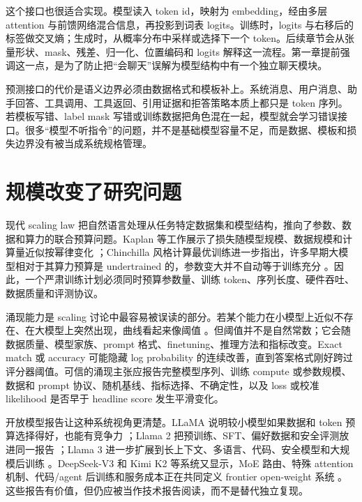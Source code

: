 \documentclass[UTF8,zihao=-4,openany]{ctexbook}
\begin{document}
这个接口也很适合实现。模型读入 token id，映射为 embedding，经由多层 attention 与前馈网络混合信息，再投影到词表 logits。训练时，logits 与右移后的标签做交叉熵；生成时，从概率分布中采样或选择下一个 token。后续章节会从张量形状、mask、残差、归一化、位置编码和 logits 解释这一流程。第一章提前强调这一点，是为了防止把“会聊天”误解为模型结构中有一个独立聊天模块。

预测接口的代价是语义边界必须由数据格式和模板补上。系统消息、用户消息、助手回答、工具调用、工具返回、引用证据和拒答策略本质上都只是 token 序列。若模板写错、label mask 写错或训练数据把角色混在一起，模型就会学习错误接口。很多“模型不听指令”的问题，并不是基础模型容量不足，而是数据、模板和损失边界没有被当成系统规格管理。

\section{规模改变了研究问题}
现代 scaling law 把自然语言处理从任务特定数据集和模型结构，推向了参数、数据和算力的联合预算问题。Kaplan 等工作展示了损失随模型规模、数据规模和计算量近似按幂律变化 \cite{kaplan2020scaling}；Chinchilla 风格计算最优训练进一步指出，许多早期大模型相对于其算力预算是 undertrained 的，参数变大并不自动等于训练充分 \cite{hoffmann2022training}。因此，一个严肃训练计划必须同时预算参数量、训练 token、序列长度、硬件吞吐、数据质量和评测协议。

涌现能力是 scaling 讨论中最容易被误读的部分。若某个能力在小模型上近似不存在、在大模型上突然出现，曲线看起来像阈值 \cite{wei2022emergent}。但阈值并不是自然常数；它会随数据质量、模型家族、prompt 格式、finetuning、推理方法和指标改变。Exact match 或 accuracy 可能隐藏 log probability 的连续改善，直到答案格式刚好跨过评分器阈值。可信的涌现主张应报告完整模型序列、训练 compute 或参数规模、数据和 prompt 协议、随机基线、指标选择、不确定性，以及 loss 或校准 likelihood 是否早于 headline score 发生平滑变化。

开放模型报告让这种系统视角更清楚。LLaMA 说明较小模型如果数据和 token 预算选择得好，也能有竞争力 \cite{touvron2023llama}；Llama 2 把预训练、SFT、偏好数据和安全评测放进同一报告 \cite{touvron2023llama2}；Llama 3 进一步扩展到长上下文、多语言、代码、安全模型和大规模后训练 \cite{dubey2024llama3}。DeepSeek-V3 和 Kimi K2 等系统又显示，MoE 路由、特殊 attention 机制、代码/agent 后训练和服务成本正在共同定义 frontier open-weight 系统 \cite{deepseek2024v3,kimi2025k2}。这些报告有价值，但仍应被当作技术报告阅读，而不是替代独立复现。
\end{document}
